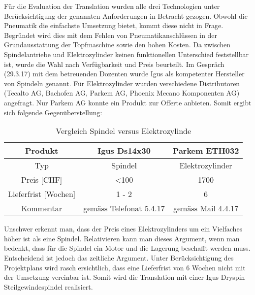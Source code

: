Für die Evaluation der Translation wurden alle drei Technologien unter Berücksichtigung der genannten Anforderungen in Betracht gezogen. Obwohl die Pneumatik die einfachste Umsetzung bietet, kommt diese nicht in Frage. Begründet wird dies mit dem Fehlen von Pneumatikanschlüssen in der Grundausstattung der Topfmaschine sowie den hohen Kosten.
\newline
Da zwischen Spindelantriebe und Elektrozylinder keinen funktionellen Unterschied feststellbar ist, wurde die Wahl nach Verfügbarkeit und Preis beurteilt. Im Gespräch (29.3.17) mit dem betreuenden Dozenten wurde Igus als kompetenter Hersteller von Spindeln genannt. Für Elektrozylinder wurden verschiedene Distributoren (Tecalto AG, Bachofen AG, Parkem AG, Phoenix Mecano Komponenten AG) angefragt. Nur Parkem AG konnte ein Produkt zur Offerte anbieten. Somit ergibt sich folgende Gegenüberstellung:
\begin{table}[H]
\begin{tabular}{|c|c|c|}
	\hline 
	Produkt & Igus Ds14x30 & Parkem ETH032  \\ 
	\hline 
	Typ & Spindel & Elektrozylinder \\ 
	\hline 
	Preis [CHF] & <100  & 1700    \\ 
	\hline 
	Lieferfrist [Wochen] &1 - 2  &6 \\ 
	\hline 
	Kommentar & gemäss Telefonat 5.4.17 & gemäss Mail 4.4.17 \\ 
	\hline 
\end{tabular}
	\vspace{0.2cm}
	\caption{Vergleich Spindel versus Elektrozylinde}
	\label{tab:spindelauslegung}
\end{table}
Unschwer erkennt man, dass der Preis eines Elektrozylinders um ein Vielfaches höher ist als eine Spindel. Relativieren kann man dieses Argument, wenn man bedenkt, dass für die Spindel ein Motor und die Lagerung beschafft werden muss. Entscheidend ist jedoch das zeitliche Argument. Unter Berücksichtigung des Projektplans wird rasch ersichtlich, dass eine Lieferfrist von 6 Wochen nicht mit der Umsetzung vereinbar ist. Somit wird die Translation mit einer Igus Dryspin Steilgewindespindel realisiert.


